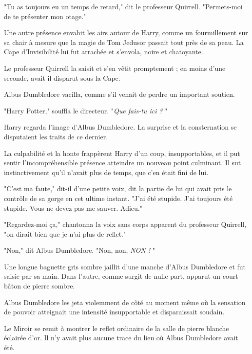 "Tu as toujours eu un temps de retard," dit le professeur Quirrell. "Permets-moi de te présenter mon otage."

Une autre présence envahit les airs autour de Harry, comme un fourmillement sur sa chair à mesure que la magie de Tom Jedusor passait tout près de sa peau. La Cape d'Invisibilité lui fut arrachée et s'envola, noire et chatoyante.

Le professeur Quirrell la saisit et s'en vêtit promptement ; en moins d'une seconde, avait il disparut sous la Cape.

Albus Dumbledore vacilla, comme s'il venait de perdre un important soutien.

"Harry Potter," souffla le directeur. "\emph{Que fais-tu ici ?} "

Harry regarda l'image d'Albus Dumbledore. La surprise et la consternation se disputaient les traits de ce dernier.

La culpabilité et la honte frappèrent Harry d'un coup, insupportables, et il put sentir l'incompréhensible présence atteindre un nouveau point culminant. Il sut instinctivement qu'il n'avait plus de temps, que c'en était fini de lui.

"C'est ma faute," dit-il d'une petite voix, dit la partie de lui qui avait pris le contrôle de sa gorge en cet ultime instant. "J'ai été stupide. J'ai toujours été stupide. Vous ne devez pas me sauver. Adieu."

"Regardez-moi ça," chantonna la voix sans corps apparent du professeur Quirrell, "on dirait bien que je n'ai plus de reflet."

"Non," dit Albus Dumbledore. "Non, non, \emph{NON !} "

Une longue baguette gris sombre jaillit d'une manche d'Albus Dumbledore et fut saisie par sa main. Dans l'autre, comme surgit de nulle part, apparut un court bâton de pierre sombre.

Albus Dumbledore les jeta violemment de côté au moment même où la sensation de pouvoir atteignait une intensité insupportable et disparaissait soudain.

Le Miroir se remit à montrer le reflet ordinaire de la salle de pierre blanche éclairée d'or. Il n'y avait plus aucune trace du lieu où Albus Dumbledore avait été.

